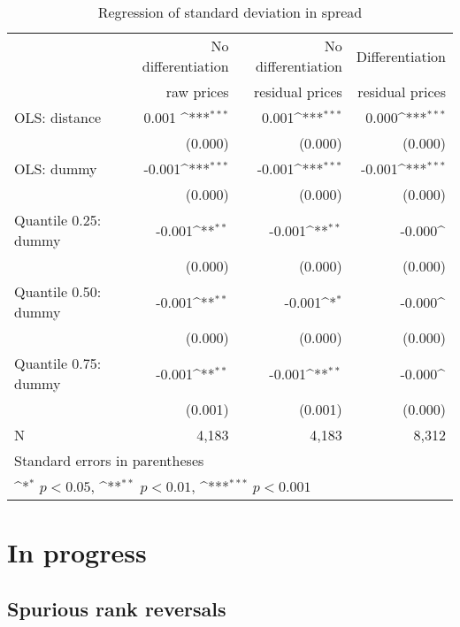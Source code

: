 \documentclass[english]{article}
\begin{document}
{{\begin{table}[!htbp]\centering
\def\sym#1{\ifmmode^{#1}\else\(^{#1}\)\fi}
\caption{Regression of standard deviation in spread}
\begin{tabular}{lrrr}
\hline
\hline
{} & No differentiation & No differentiation & Differentiation \\
{} & raw prices & residual prices & residual prices \\
\hline
OLS: distance &  0.001 \sym{***}&      0.001\sym{***}&       0.000\sym{***}\\
{} &     (0.000)         &     (0.000)         &     (0.000)   \\
OLS: dummy &  -0.001\sym{***}&      -0.001\sym{***}&     -0.001\sym{***}\\
{} &    (0.000)     &     (0.000)         &     (0.000) \\
Quantile 0.25: dummy     &       -0.001\sym{**}&       -0.001\sym{**}&       -0.000\sym{}\\
{} &     (0.000)       &     (0.000)         &     (0.000)  \\
Quantile 0.50: dummy     &       -0.001\sym{**}&      -0.001\sym{*}&       -0.000\sym{}\\
{} &  (0.000)         &     (0.000)         &     (0.000)    \\
Quantile 0.75: dummy     &       -0.001\sym{**}&     -0.001\sym{**}&       -0.000\sym{}\\
{} &     (0.001)         &     (0.001)         &     (0.000)   \\
\hline
N      &     4,183         &     4,183      &     8,312    \\
\hline\hline
\multicolumn{4}{l}{\footnotesize Standard errors in parentheses}\\
\multicolumn{4}{l}{\footnotesize \sym{*} \(p<0.05\), \sym{**} \(p<0.01\), \sym{***} \(p<0.001\)}\\
\end{tabular}
\end{table}

\newpage

\section{In progress}

\subsection{Spurious rank reversals}

}}
\end{document}
